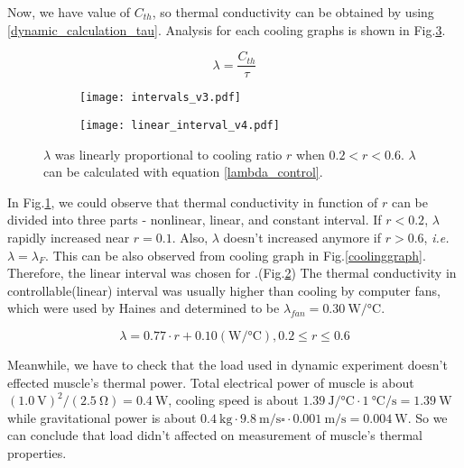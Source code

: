 Now, we have value of $C_{th}$, so thermal conductivity can be obtained by using \eqref{dynamic_calculation_tau}. Analysis for each cooling graphs is shown in Fig.\ref{analysis_dynamic}.

\begin{equation} \label{dynamic_calculation_tau}
\lambda = \frac{C_{th}}{\tau}
\end{equation}

\begin{figure}[t]
	\begin{subfigure}[t]{0.52\linewidth}
		\centering\texttt{[image: intervals\_v3.pdf]}
		\caption{\label{dynamic_proportional}}
	\end{subfigure}%
	\begin{subfigure}[t]{0.39\linewidth}
		\centering\texttt{[image: linear\_interval\_v4.pdf]}
		\caption{\label{linear_interval}}
	\end{subfigure}
	\caption[Analysis of dynamic experiment]{ $\lambda$ was linearly proportional to cooling ratio $r$ when $0.2<r<0.6$.   $\lambda$ can be calculated with equation \eqref{lambda_control}.}
	\label{analysis_dynamic}
\end{figure}

In Fig.\ref{dynamic_proportional}, we could observe that thermal conductivity in function of $r$ can be divided into three parts - nonlinear, linear, and constant interval. If $r<0.2$, $\lambda$ rapidly increased near $r=0.1$. Also, $\lambda$ doesn't increased anymore if $r>0.6$, {\it i.e.} $\lambda = \lambda_{F}$. This can be also observed from cooling graph in Fig.\ref{coolinggraph}.
Therefore, the linear interval was chosen for \Apcnospace.(Fig.\ref{linear_interval}) The thermal conductivity in controllable(linear) interval was usually higher than cooling by computer fans, which were used by Haines \etalspace and determined to be $\lambda_{fan}=\SI{0.30}{\watt\per\degreeCelsius}$.

\begin{equation} \label{lambda_control}
\lambda = 0.77\cdot r + 0.10 (\si{\watt\per\degreeCelsius}), 0.2\leq r \leq 0.6
\end{equation}


Meanwhile, we have to check that the load used in dynamic experiment doesn't effected muscle's thermal power. %
Total electrical power of muscle is about $(\SI{1.0}{\volt})^2/(\SI{2.5}{\ohm})=\SI{0.4}{\watt}$, cooling speed is about $\SI{1.39}{\joule\per\degreeCelsius} \cdot \SI{1}{\degreeCelsius\per\second}=\SI{1.39}{\watt}$ while gravitational power is about  $\SI{0.4}{\kilo\gram} \cdot  \SI{9.8}{\meter\per\second\square} \cdot \SI{0.001}{\meter\per\second}=\SI{0.004}{\watt}$. So we can conclude that load didn't affected on measurement of muscle's thermal properties.



